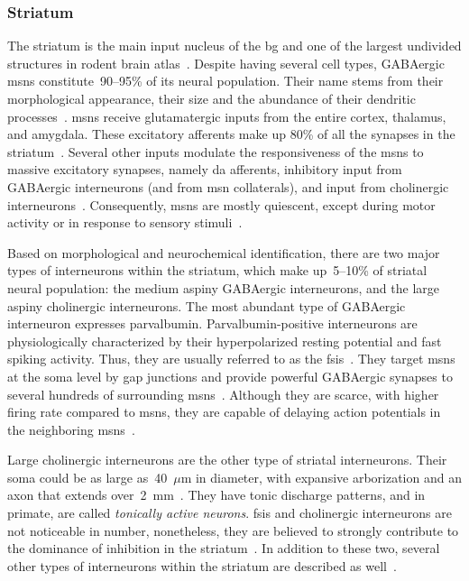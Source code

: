 \subsubsection{Striatum} \label{intro:anatomy:striatum}
The striatum is the main input nucleus of the \gls{bg} and one of the largest undivided structures in rodent brain atlas~\cite{Hintiryan2016NN}.
Despite having several cell types, GABAergic \glspl{msn} constitute~90--95\% of its neural population.
Their name stems from their morphological appearance, their size and the abundance of their dendritic processes~\cite{TURNER2000BasalFunction}.
\Glspl{msn} receive glutamatergic inputs from the entire cortex, thalamus, and amygdala.
These excitatory afferents make up 80\% of all the synapses in the striatum~\cite{Wilson2007GABAergicNeostriatum}.
Several other inputs modulate the responsiveness of the \glspl{msn} to massive excitatory synapses, namely \gls{da} afferents, inhibitory input from GABAergic interneurons (and from \gls{msn} collaterals), and input from cholinergic interneurons~\cite{Dudman2015Book}.
Consequently, \glspl{msn} are mostly quiescent, except during motor activity or in response to sensory stimuli~\cite{KandelBook2001}.
\par
Based on morphological and neurochemical identification, there are two major types of interneurons within the striatum, which make up~5--10\% of striatal neural population:
    the medium aspiny GABAergic interneurons, and the large aspiny cholinergic interneurons.
The most abundant type of GABAergic interneuron expresses parvalbumin.
Parvalbumin-positive interneurons are physiologically characterized by their hyperpolarized resting potential and fast spiking activity.
Thus, they are usually referred to as the \Glspl{fsi}~\cite{Dudman2015Book}.
They target \glspl{msn} at the soma level by gap junctions and provide powerful GABAergic synapses to several hundreds of surrounding \glspl{msn}~\cite{Grillner2016BG, Gage2010FSI}.
Although they are scarce, with higher firing rate compared to \glspl{msn}, they are capable of delaying action potentials in the neighboring \glspl{msn}~\cite{Wilson2007GABAergicNeostriatum}.
\par
Large cholinergic interneurons are the other type of striatal interneurons.
Their soma could be as large as~40~$\mu$m in diameter, with expansive arborization and an axon that extends over~2~mm~\cite{Dudman2015Book}.
They have tonic discharge patterns, and in primate, are called \textit{tonically active neurons}.
\Glspl{fsi} and cholinergic interneurons are not noticeable in number, nonetheless, they are believed to strongly contribute to the dominance of inhibition in the striatum~\cite{Gage2010FSI}.
In addition to these two, several other types of interneurons within the striatum are described as well~\cite[see][]{Grillner2016BG, Dudman2015Book}.
